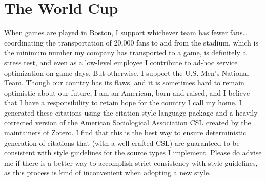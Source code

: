 \documentclass[12pt]{article}
\begin{document}
\section{The World Cup}
When games are played in Boston, I support whichever team has fewer fans\dots coordinating the transportation of 20,000 fans to and from the stadium, which is the minimum number my company has transported to a game, is definitely a stress test, and even as a low-level employee I contribute to ad-hoc service optimization on game days.
But otherwise, I support the U.S. Men's National Team.
Though our country has its flaws, and it is sometimes hard to remain optimistic about our future, I am an American, born and raised, and I believe that I have a responsibility to retain hope for the country I call my home.
\printbibliography
I generated these citations using the citation-style-language package and a heavily corrected version of the American Sociological Association CSL created by the maintainers of Zotero.
I find that this is the best way to ensure deterministic generation of citations that (with a well-crafted CSL) are guaranteed to be consistent with style guidelines for the source types I implement.
Please do advise me if there is a better way to accomplish strict consistency with style guidelines, as this process is kind of inconvenient when adopting a new style.
\end{document}
